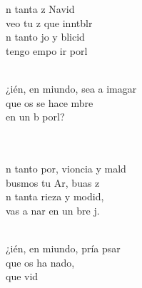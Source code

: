 \documentclass[12pt]{article}
\begin{document}
\begin{multicols*}{2}
\begin{cancion}%
	n tanta z  Navid\\
	 veo tu z que inntblr \\
	n tanto jo y blicid\\
	 tengo empo  ir  porl \\\jump\\
	\begin{chorus}%
	¿ién, en miundo, sea a imagar \\
	que os se hace mbre\\
	en un b porl?  \\
	\end{chorus}%
	\jump\\
	  \\
\jump
	n tanto por, vioncia y mald\\
	busmos tu Ar, buas  z \\
	n tanta rieza y modid,\\
	 vas a nar en un bre j. \\\jump\\
	\begin{chorus}%
	¿ién, en miundo, pría psar \\
	que os ha nado,\\
	que  vid \\
	\end{chorus}%
	\jump\\

\end{cancion}
\end{multicols*}
\end{document}
